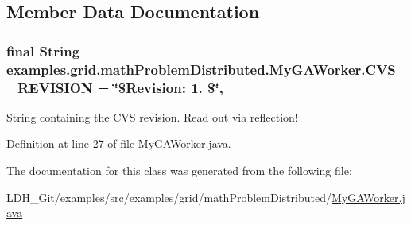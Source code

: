 \subsection{Member Data Documentation}
\hypertarget{classexamples_1_1grid_1_1math_problem_distributed_1_1_my_g_a_worker_aba924c9ae9ce3b9fa2a893f5ddd11a22}{
\subsubsection[{C\-V\-S\-\_\-\-R\-E\-V\-I\-S\-I\-O\-N}]{\setlength{\rightskip}{0pt plus 5cm}final String examples.\-grid.\-math\-Problem\-Distributed.\-My\-G\-A\-Worker.\-C\-V\-S\-\_\-\-R\-E\-V\-I\-S\-I\-O\-N = \char`\"{}\$Revision\-: 1. \$\char`\"{}\hspace{0.3cm}{\ttfamily [static]}, {\ttfamily [private]}}}\label{classexamples_1_1grid_1_1math_problem_distributed_1_1_my_g_a_worker_aba924c9ae9ce3b9fa2a893f5ddd11a22}
String containing the C\-V\-S revision. Read out via reflection! 

Definition at line 27 of file My\-G\-A\-Worker.\-java.



The documentation for this class was generated from the following file\-:\begin{DoxyCompactItemize}
\item 
L\-D\-H\-\_\-\-Git/examples/src/examples/grid/math\-Problem\-Distributed/\hyperlink{math_problem_distributed_2_my_g_a_worker_8java}{My\-G\-A\-Worker.\-java}\end{DoxyCompactItemize}
